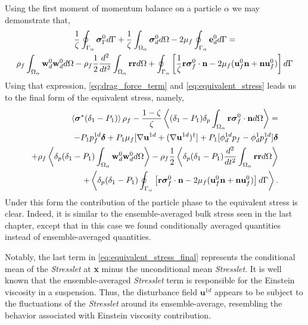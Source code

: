 Using the first moment of momentum balance on a particle $\alpha$ we may demonstrate that, 
\begin{multline}
    \frac{1}{\zeta}\intS{ \bm{\sigma}_\Gamma^0}
    +
    \frac{1}{\zeta}
    \intO{ \bm{\sigma}_d^0}
    - 2\mu_f \intS{ \textbf{e}^0_d}
    = \\
    \rho_f \intO{ \textbf{w}_d^0\textbf{w}_d^0 }
    - \rho_f \frac{1}{2}\frac{d^2}{dt^2} \intO{\textbf{rr}} 
    +
    \intS{\left[
        \frac{1}{\zeta}
        \textbf{r}\bm{\sigma}_f^0 \cdot \textbf{n}
        -2 \mu_f (\textbf{u}_f^0 \textbf{n} + \textbf{n} \textbf{u}_f^0)
        \right] 
    }
    \label{eq:dt_P1_alpha_bis_bis}
\end{multline}
Using that expression,  \ref{eq:drag_force_term} and \ref{eq:equivalent_stress} leads us to the final form of the equivalent stress, namely, 
\begin{align}
    \avg{\bm\sigma^* (\delta_1 - P_1)} \rho_f - \frac{1-\zeta}{\zeta}\avg{ (\delta_1 - P_1) \delta_p \intO{\textbf{r}\bm\sigma_f^0\cdot \textbf{n}}} = \nonumber \\
    - P_1  p_f^{1d}\bm\delta
    + P_1 \mu_f [\grad \textbf{u}^{1d}+(\grad \textbf{u}^{1d})^\dagger] 
    +P_1 [\phi_d^{1d} p_f
    - \phi_d^1 p_f^{1d}]\bm\delta \nonumber  \\
    + \rho_f \pavg{(\delta_1 - P_1) \intO{\textbf{w}_d^0\textbf{w}_d^0 }}
    - \rho_f \frac{1}{2}\pavg{(\delta_1 - P_1)\frac{d^2}{dt^2} \intO{\textbf{rr}} } \nonumber \\
    + \pavg{(\delta_1 - P_1) \intS{\left[
         \textbf{r}\bm{\sigma}_f^0 \cdot \textbf{n}
        -  2 \mu_f (\textbf{u}_f^0 \textbf{n} + \textbf{n} \textbf{u}_f^0)
        \right] 
    }}.  
    \label{eq:equivalent_stress_final}
\end{align}
Under this form the contribution of the particle phase to the equivalent stress is clear. 
Indeed, it is similar to the ensemble-averaged bulk stress seen in the last chapter, except that in this case we found conditionally averaged quantities instead of ensemble-averaged quantities. 

Notably, the last term in \ref{eq:equivalent_stress_final} represents the conditional mean of the \textit{Stresslet} at \textbf{x} minus the unconditional mean \textit{Stresslet}. 
It is well known that the ensemble-averaged \textit{Stresslet} term is responsible for the Einstein viscosity in a suspension. 
Thus, the disturbance field $\textbf{u}^{1d}$ appears to be subject to the fluctuations of the \textit{Stresslet} around its ensemble-average, resembling the behavior associated with Einstein viscosity contribution. 

